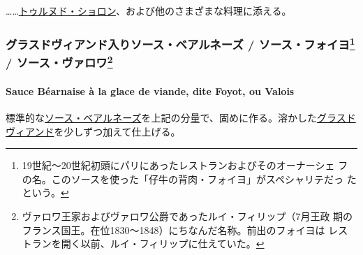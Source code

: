 \begin{recette}
\ldots{}\ldots{}\href{}{トゥルヌド・ショロン}、および他のさまざまな料理に添える。

\maeaki

\hypertarget{ux30b0ux30e9ux30b9ux30c9ux30f4ux30a3ux30a2ux30f3ux30c9ux5165ux308aux30bdux30fcux30b9ux30d9ux30a2ux30ebux30cdux30fcux30ba-ux30bdux30fcux30b9ux30d5ux30a9ux30a4ux30e811-ux30bdux30fcux30b9ux30f4ux30a1ux30edux30ef12}{%
\subsubsection[グラスドヴィアンド入りソース・ベアルネーズ /
ソース・フォイヨ /
ソース・ヴァロワ]{\texorpdfstring{グラスドヴィアンド入りソース・ベアルネーズ
/ ソース・フォイヨ\footnote{19世紀〜20世紀初頭にパリにあったレストランおよびそのオーナーシェ
  フの名。このソースを使った「仔牛の背肉・フォイヨ」がスペシャリテだっ
  たという。} / ソース・ヴァロワ\footnote{ヴァロワ王家およびヴァロワ公爵であったルイ・フィリップ（7月王政
  期のフランス国王。在位1830〜1848）にちなんだ名称。前出のフォイヨは
  レストランを開く以前、ルイ・フィリップに仕えていた。}}{グラスドヴィアンド入りソース・ベアルネーズ / ソース・フォイヨ / ソース・ヴァロワ}}\label{ux30b0ux30e9ux30b9ux30c9ux30f4ux30a3ux30a2ux30f3ux30c9ux5165ux308aux30bdux30fcux30b9ux30d9ux30a2ux30ebux30cdux30fcux30ba-ux30bdux30fcux30b9ux30d5ux30a9ux30a4ux30e811-ux30bdux30fcux30b9ux30f4ux30a1ux30edux30ef12}}

\hypertarget{sauce-bearnaise-a-la-glace-de-viande}{%
\paragraph{Sauce Béarnaise à la glace de viande, dite Foyot, ou
Valois}\label{sauce-bearnaise-a-la-glace-de-viande}}

 

標準的な\protect\hyperlink{sauce-bearnaise}{ソース・ベアルネーズ}を上記の分量で、固めに作る。溶かした\protect\hyperlink{glace-de-viande}{グラスドヴィアンド}を少しずつ加えて仕上げる。


\end{recette}
